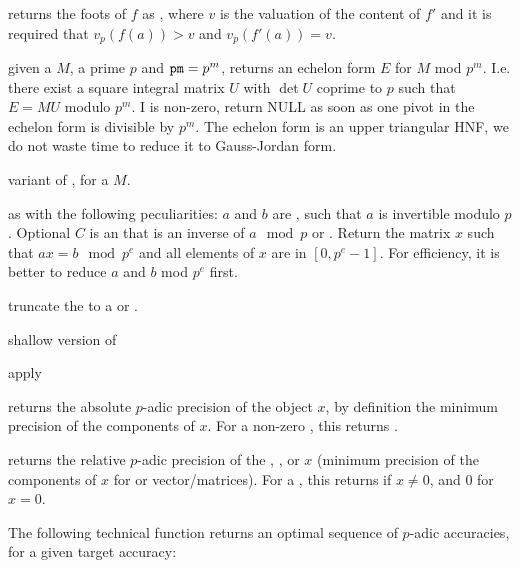 returns the foots of $f$ as , where $v$ is the valuation
of the content of $f'$ and it is required that $v_p(f(a))>v$ and
$v_p(f'(a))=v$.


 given a
 $M$, a prime $p$ and ${\tt pm} = p^m$, returns an echelon form
$E$ for $M$ mod $p^m$. I.e. there exist a square integral matrix $U$ with
$\det U$ coprime to $p$ such that $E = MU$ modulo $p^m$. I
 is non-zero, return NULL as soon as one pivot in
the echelon form is divisible by $p^m$. The echelon form is an upper
triangular HNF, we do not waste time to reduce it to Gauss-Jordan form.

variant of , for a  $M$.

 as 
with the following peculiarities: $a$ and $b$ are , such that $a$ is
invertible modulo $p$. Optional $C$ is an  that is an inverse of
$a\mod p$ or . Return the matrix $x$ such that $ax=b\mod p^e$ and
all elements of $x$ are in $[0,p^e-1]$. For efficiency, it is better
to reduce $a$ and $b$ mod $p^e$ first.

 truncate the  to a  or
.

 shallow version of 

 apply 

 returns the absolute $p$-adic precision of
the object $x$, by definition the minimum precision of the components of $x$.
For a non-zero , this returns .

 returns the relative $p$-adic
precision of the , , or  $x$ (minimum precision
of the components of $x$ for  or vector/matrices).
For a , this returns  if $x\neq0$, and $0$ for $x=0$.


The following technical function returns an optimal sequence of $p$-adic
accuracies, for a given target accuracy:

